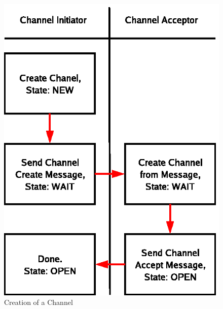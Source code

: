 \begin{figure}[!h]
  \begin{center}
    \includegraphics{diagrams/chan_create.eps}
  \end{center}
  \caption{Creation of a Channel}
  \label{chan_create}
\end{figure}


